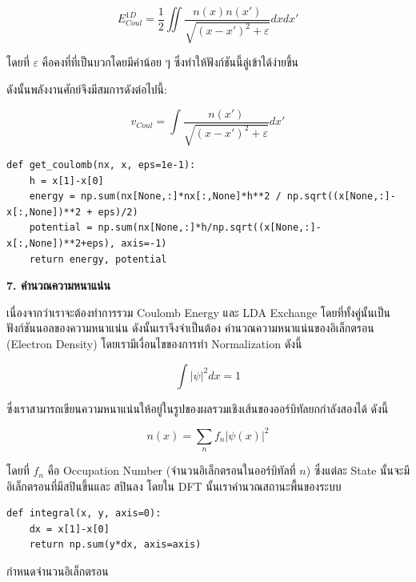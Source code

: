 \begin{equation}
    E^{1D}_{Coul} = \frac{1}{2}\iint \frac{n(x)n(x')}{\sqrt{(x-x')^2+\varepsilon}}dxdx'
\end{equation}

\noindent โดยที่ $\varepsilon$ คือคงที่ที่เป็นบวกโดยมีค่าน้อย ๆ ซึ่งทำให้ฟังก์ชันนี้ลู่เข้าได้ง่ายขึ้น

\noindent ดังนั้นพลังงานศักย์จึงมีสมการดังต่อไปนี้:

\begin{equation}
    v_{Coul} = \int \frac{n(x')}{\sqrt{(x-x')^2+\varepsilon}}dx'
\end{equation}

\begin{lstlisting}[style=MyPython]
def get_coulomb(nx, x, eps=1e-1):
    h = x[1]-x[0]
    energy = np.sum(nx[None,:]*nx[:,None]*h**2 / np.sqrt((x[None,:]-x[:,None])**2 + eps)/2)
    potential = np.sum(nx[None,:]*h/np.sqrt((x[None,:]-x[:,None])**2+eps), axis=-1)
    return energy, potential
\end{lstlisting}

\vspace{1em}
\noindent \textbf{7. คำนวณความหนาแน่น}

เนื่องจากว่าเราจะต้องทำการรวม Coulomb Energy และ LDA Exchange โดยที่ทั้งคู่นั้นเป็นฟังก์ชันนอลของความหนาแน่น ดังนั้นเราจึงจำเป็นต้อง%
คำนวณความหนาแน่นของอิเล็กตรอน (Electron Density) โดยเรามีเงื่อนไขของการทำ Normalization ดังนี้

\begin{equation}
    \int \lvert \psi \rvert ^2 dx = 1
\end{equation}

\noindent ซึ่งเราสามารถเขียนความหนาแน่นให้อยู่ในรูปของผลรวมเชิงเส้นของออร์บิทัลยกกำลังสองได้ ดังนี้ 

\begin{equation}
    n(x)=\sum_n f_n \lvert \psi(x) \rvert ^2
\end{equation}

\noindent โดยที่ $f_n$ คือ Occupation Number (จำนวนอิเล็กตรอนในออร์บิทัลที่ $n$) ซึ่งแต่ละ State นั้นจะมีอิเล็กตรอนที่มีสปินขึ้นและ%
สปินลง โดยใน DFT นั้นเราคำนวณสถานะพื้นของระบบ

\begin{lstlisting}[style=MyPython]
def integral(x, y, axis=0):
    dx = x[1]-x[0]
    return np.sum(y*dx, axis=axis)
\end{lstlisting}

\noindent กำหนดจำนวนอิเล็กตรอน

